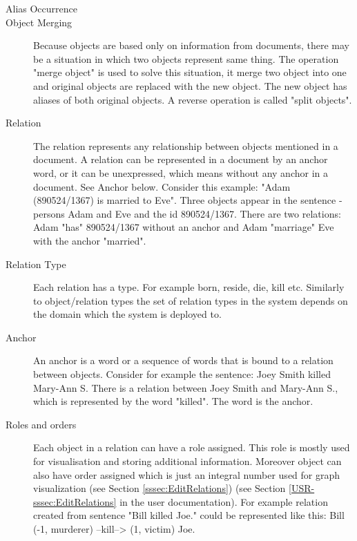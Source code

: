 \begin{description}
\item[Alias Occurrence]

\item[Object Merging]
Because objects are based only on information from documents, there may be a situation
in which two objects represent same thing. The operation "merge object" is used
to solve this situation, it merge two object into one and original objects are
replaced with the new object. The new object has aliases of both original objects.
A reverse operation is called "split objects".

\item[Relation]
The relation represents any relationship between objects mentioned in a document.
A relation can be represented in a document by an anchor word, or it can be
unexpressed, which means without any anchor in a document. See Anchor below.
Consider this example: "Adam (890524/1367) is married to Eve". Three objects
appear in the sentence - persons Adam and Eve and the id 890524/1367. There
are two relations: Adam "has" 890524/1367 without an anchor and Adam "marriage"
Eve with the anchor "married".

\item[Relation Type]
Each relation has a type. For example born, reside, die, kill etc. Similarly to
object/relation types the set of relation types in the system depends on the
domain which the system is deployed to.

\item[Anchor]
An anchor is a word or a sequence of words that is bound to a relation between
objects. Consider for example the sentence: Joey Smith killed Mary-Ann S. There
is a relation between Joey Smith and Mary-Ann S., which is represented by the
word "killed". The word is the anchor.

\item[Roles and orders]
Each object in a relation can have a role assigned. This role is mostly used
for visualisation and storing additional information. Moreover object can also
have order assigned which is just an integral number used for graph
visualization\ifdefined\USRDOC{} (see Section \ref{sssec:EditRelations})\fi{}
\ifdefined\DEVDOC{} (see Section \ref{USR-sssec:EditRelations} in the user
documentation)\fi{}. For example relation created from sentence
"Bill killed Joe." could be represented like this:
Bill (-1, murderer) --kill--> (1, victim) Joe.
\end{description}

